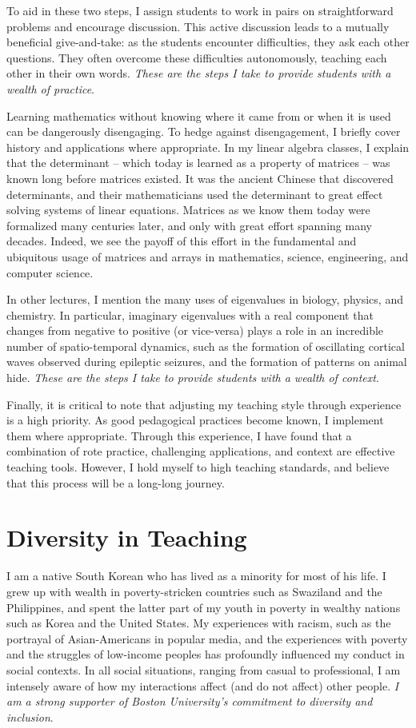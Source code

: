 \documentclass[a4paper,11pt]{article}
\begin{document}
To aid in these two steps, I assign students to work in pairs on straightforward problems and encourage discussion. This active discussion leads to a mutually beneficial give-and-take:  as the students encounter difficulties, they ask each other questions. They often overcome these difficulties autonomously, teaching each other in their own words. \textit{These are the steps I take to provide students with a wealth of practice}.

Learning mathematics without knowing where it came from or when it is used can be dangerously disengaging. To hedge against disengagement, I briefly cover history and applications where appropriate. In my linear algebra classes, I explain that the determinant -- which today is learned as a property of matrices -- was known long before matrices existed. It was the ancient Chinese that discovered determinants, and their mathematicians used the determinant to great effect solving systems of linear equations. Matrices as we know them today were formalized many centuries later, and only with great effort spanning many decades. Indeed, we see the payoff of this effort in the fundamental and ubiquitous usage of matrices and arrays in mathematics, science, engineering, and computer science.

In other lectures, I mention the many uses of eigenvalues in biology, physics, and chemistry. In particular, imaginary eigenvalues with a real component that changes from negative to positive (or vice-versa) plays a role in an incredible number of spatio-temporal dynamics, such as the formation of oscillating cortical waves observed during epileptic seizures, and the formation of patterns on animal hide. \textit{These are the steps I take to provide students with a wealth of context}.

Finally, it is critical to note that adjusting my teaching style through experience is a high priority. As good pedagogical practices become known, I implement them where appropriate. Through this experience, I have found that a combination of rote practice, challenging applications, and context are effective teaching tools. However, I hold myself to high teaching standards, and believe that this process will be a long-long journey.

\section{Diversity in Teaching}
I am a native South Korean who has lived as a minority for most of his life. I grew up with wealth in poverty-stricken countries such as Swaziland and the Philippines, and spent the latter part of my youth in poverty in wealthy nations such as Korea and the United States. My experiences with racism, such as the portrayal of Asian-Americans in popular media, and the experiences with poverty and the struggles of low-income peoples has profoundly influenced my conduct in social contexts. In all social situations, ranging from casual to professional, I am intensely aware of how my interactions affect (and do not affect) other people. \textit{I am a strong supporter of Boston University's commitment to diversity and inclusion}.
\end{document}
